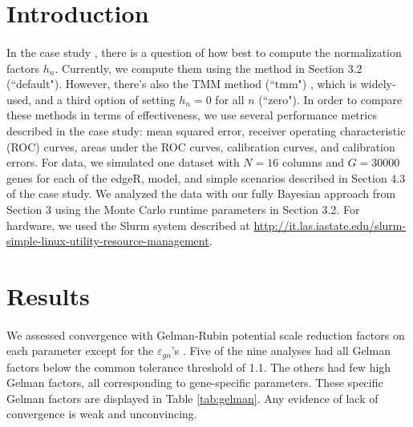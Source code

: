 \documentclass{article}
\begin{document}
\begin{flushleft}

\section{Introduction}

\paragraph{} In the case study \cite{thesispaper2}, there is a question of how best to compute the normalization factors $h_n$. Currently, we compute them using the method in Section 3.2 (``default"). However, there's also the TMM method (``tmm") \cite{robinson2010scaling}, which is widely-used, and a third option of setting $h_n = 0$ for all $n$ (``zero"). In order to compare these methods in terms of effectiveness, we use several performance metrics described in the case study: mean squared error, receiver operating characteristic (ROC) curves, areas under the ROC curves, calibration curves, and calibration errors. For data, we simulated one dataset with $N = 16$ columns and $G = 30000$ genes for each of the edgeR, model, and simple scenarios described in Section 4.3 of the case study. We analyzed the data with our fully Bayesian approach from Section 3 using the Monte Carlo runtime parameters in Section 3.2. For hardware, we used the Slurm system described at \url{http://it.las.iastate.edu/slurm-simple-linux-utility-resource-management}.

\section{Results} \label{sec:results}

\paragraph{} We assessed convergence with Gelman-Rubin potential scale reduction factors on each parameter except for the $\varepsilon_{gn}$'s \cite{bda}. Five of the nine analyses had all Gelman factors below the common tolerance threshold of 1.1. The others had few high Gelman factors, all corresponding to gene-specific parameters. These specific Gelman factors are displayed in Table \ref{tab:gelman}. Any evidence of lack of convergence is weak and unconvincing.


\end{flushleft}
\end{document}
